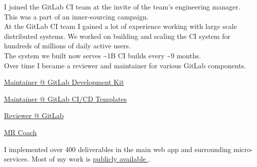 \documentclass[]{matija-resume}
\begin{document}
\begin{minipage}[t]{1.0\textwidth}
\vspace{\topsep}
I joined the GitLab CI team at the invite of the team's engineering manager. This was a part of an inner-sourcing campaign.\\
\vspace{\topsep}
At the GitLab CI team I gained a lot of experience working with large scale distributed systems. We worked on building and scaling the CI system for hundreds of millions of daily active users.\\
\vspace{\topsep}
The system we built now serves \textasciitilde 1B CI builds every \textasciitilde 9 months.\\
\vspace{\topsep}
Over time I became a reviewer and maintainer for various GitLab components.
\vspace{\topsep}
\begin{tightemize}
\item \href{https://gitlab.com/gitlab-org/gitlab-development-kit/}{Maintainer @ GitLab Development Kit }
\item \href{https://gitlab.com/gitlab-org/gitlab/-/tree/master/lib/gitlab/ci/templates}{Maintainer @ GitLab CI/CD Templates }
\item \href{https://gitlab.com/gitlab-org/gitlab/}{Reviewer @ GitLab }
\item \href{https://about.gitlab.com/job-families/expert/merge-request-coach/}{MR Coach }
\end{tightemize}
\vspace{\topsep}
I implemented over 400 deliverables in the main web app and surrounding micro-services. Most of my work is \href{https://gitlab.com/gitlab-org/gitlab/-/merge_requests/?sort=updated_desc&state=merged&author_username=matteeyah&first_page_size=20}{publicly } \href{https://gitlab.com/gitlab-org/gitlab-foss/-/merge_requests?scope=all&state=merged&author_username=matteeyah}{available }.\\
\vspace{\topsep}
\sectionsep


\end{minipage}
\end{document}

